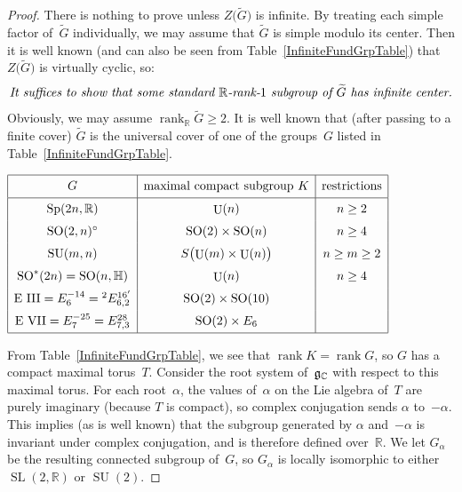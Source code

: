 \documentclass[pdftex]{sigma}
\newcommand{\CC}{\mathbb{C}}
\newcommand{\HH}{\mathbb{H}}
\newcommand{\RR}{\mathbb{R}}
\DeclareMathOperator{\rank}{rank}
\DeclareMathOperator{\SO}{SO}
\DeclareMathOperator{\Sp}{Sp}
\DeclareMathOperator{\SL}{SL}
\DeclareMathOperator{\SU}{SU}
\DeclareMathOperator{\Unitary}{U}
\newcommand{\cover}{\widetilde}
\newcommand{\Lie}[1]{\lowercase{\mathfrak{#1}}}
\numberwithin{equation}{section}
\theoremstyle{definition}
\begin{document}
\begin{proof}There is nothing to prove unless $Z\big(\cover G\big)$ is infinite.
By treating each simple factor of~$\cover G$ individually, we may assume that $\cover G$ is simple modulo its center. Then it is well known (and can also be seen from Table~\ref{InfiniteFundGrpTable}) that $Z\big(\cover G\big)$ is virtually cyclic, so:
	\[ \text{\it It suffices to show that some standard $\RR$-rank-$1$ subgroup of~$\cover G$ has infinite center.} \]
Obviously, we may assume $\rank_\RR \cover G \ge 2$.
It is well known that (after passing to a finite cover) $\cover G$ is the universal cover of one of the groups~$G$ listed in Table~\ref{InfiniteFundGrpTable}.

	\begin{table}[ht]
	\centerline{$\begin{array}{|c|c|c|}
	\noalign{\hrule}
	G & \text{maximal compact subgroup $K$} & \text{restrictions} \vphantom{\Big|}\\
	\noalign{\hrule}
	\Sp(2n,\RR) & \Unitary(n) & n \ge 2 \vphantom{\Big|}\\
	\SO(2,n)^\circ & \SO(2) \times \SO(n) & n \ge 4 \vphantom{\Big|}\\
	\SU(m,n) & S \bigl( \Unitary(m) \times \Unitary(n) \bigr) & n \ge m \ge 2 \vphantom{\Big|}\\
	\SO^*(2n) = \SO(n,\HH) & \Unitary(n) & n \ge 4 \vphantom{\Big|}\\
	\text{E III} = E_6^{-14} = {}^2E_{6,2}^{16'} & \SO(2) \times \SO(10) & \vphantom{\Big|}\\
	\text{E VII} = E_7^{-25} = E_{7,3}^{28} & \SO(2) \times E_6\vphantom{\Big|} & \\
	\noalign{\hrule}
	\end{array}$}
	\caption{Simple Lie groups with infinite fundamental group and real rank at least two. (The group $\SU(1,n)$ of real rank one is deleted from the well-known list in \cite[p.~518]{Helgason-DiffLieSymm} and \cite[(7.147), p.~513]{Knapp-BeyondIntro}.)} \label{InfiniteFundGrpTable}
	\end{table}

From Table~\ref{InfiniteFundGrpTable}, we see that $\rank K = \rank G$, so $G$ has a compact maximal torus~$T$. Consider the root system of~$\Lie G_\CC$ with respect to this maximal torus. For each root~$\alpha$,
the values of~$\alpha$ on the Lie algebra of~$T$ are purely imaginary (because $T$ is compact), so complex conjugation sends $\alpha$ to~$-\alpha$. This implies (as is well known) that the subgroup generated by $\alpha$ and~$-\alpha$ is invariant under complex conjugation, and is therefore defined over~$\RR$. We let $G_\alpha$ be the resulting connected subgroup of~$G$, so $G_\alpha$ is locally isomorphic to either $\SL(2,\RR)$ or $\SU(2)$.


\end{proof}
\end{document}
